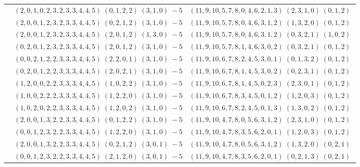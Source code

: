 \documentclass[11pt]{article}
\begin{document}
\begin{longtable}[l]{|c|c|c|}
 \cline{2-3} 
 & $(2 ,0 ,1 ,0 ,2 ,3 ,2 ,3 ,3 ,4 ,4 ,5) \;(0 ,1 ,2 ,2) \;(3 ,1 ,0) \;-5$ & $(11 ,9 ,10 ,5 ,7 ,8 ,0 ,4 ,6 ,2 ,1 ,3) \;(2 ,3 ,1 ,0) \;(0 ,1 ,2) \;$\\ 
 \cline{2-3} 
 & $(2 ,0 ,0 ,1 ,2 ,3 ,2 ,3 ,3 ,4 ,4 ,5) \;(0 ,2 ,1 ,2) \;(3 ,1 ,0) \;-5$ & $(11 ,9 ,10 ,5 ,7 ,8 ,0 ,4 ,6 ,3 ,1 ,2) \;(1 ,3 ,2 ,0) \;(0 ,1 ,2) \;$\\ 
 \cline{2-3} 
 & $(2 ,0 ,0 ,1 ,2 ,3 ,2 ,3 ,3 ,4 ,4 ,5) \;(2 ,0 ,1 ,2) \;(1 ,3 ,0) \;-5$ & $(11 ,9 ,10 ,5 ,7 ,8 ,0 ,4 ,6 ,3 ,1 ,2) \;(0 ,3 ,2 ,1) \;(1 ,0 ,2) \;$\\ 
 \cline{2-3} 
 & $(0 ,2 ,0 ,1 ,2 ,3 ,2 ,3 ,3 ,4 ,4 ,5) \;(2 ,0 ,1 ,2) \;(3 ,1 ,0) \;-5$ & $(11 ,9 ,10 ,5 ,7 ,8 ,1 ,4 ,6 ,3 ,0 ,2) \;(0 ,3 ,2 ,1) \;(0 ,1 ,2) \;$\\ 
 \cline{2-3} 
 & $(0 ,0 ,2 ,1 ,2 ,2 ,3 ,3 ,3 ,4 ,4 ,5) \;(2 ,2 ,0 ,1) \;(3 ,1 ,0) \;-5$ & $(11 ,9 ,10 ,6 ,7 ,8 ,2 ,4 ,5 ,3 ,0 ,1) \;(0 ,1 ,3 ,2) \;(0 ,1 ,2) \;$\\ 
 \cline{2-3} 
 & $(0 ,2 ,0 ,1 ,2 ,2 ,3 ,3 ,3 ,4 ,4 ,5) \;(2 ,0 ,2 ,1) \;(3 ,1 ,0) \;-5$ & $(11 ,9 ,10 ,6 ,7 ,8 ,1 ,4 ,5 ,3 ,0 ,2) \;(0 ,2 ,3 ,1) \;(0 ,1 ,2) \;$\\ 
 \cline{2-3} 
 & $(1 ,2 ,0 ,0 ,2 ,2 ,3 ,3 ,3 ,4 ,4 ,5) \;(1 ,0 ,2 ,2) \;(3 ,1 ,0) \;-5$ & $(11 ,9 ,10 ,6 ,7 ,8 ,1 ,4 ,5 ,0 ,2 ,3) \;(2 ,3 ,0 ,1) \;(0 ,1 ,2) \;$\\ 
 \cline{2-3} 
 & $(1 ,0 ,0 ,2 ,2 ,2 ,3 ,3 ,3 ,4 ,4 ,5) \;(1 ,2 ,2 ,0) \;(3 ,1 ,0) \;-5$ & $(11 ,9 ,10 ,6 ,7 ,8 ,3 ,4 ,5 ,0 ,1 ,2) \;(1 ,2 ,0 ,3) \;(0 ,1 ,2) \;$\\ 
 \cline{2-3} 
 & $(1 ,0 ,2 ,0 ,2 ,2 ,3 ,3 ,3 ,4 ,4 ,5) \;(1 ,2 ,0 ,2) \;(3 ,1 ,0) \;-5$ & $(11 ,9 ,10 ,6 ,7 ,8 ,2 ,4 ,5 ,0 ,1 ,3) \;(1 ,3 ,0 ,2) \;(0 ,1 ,2) \;$\\ 
 \cline{2-3} 
 & $(2 ,0 ,0 ,1 ,3 ,2 ,2 ,3 ,3 ,4 ,4 ,5) \;(0 ,1 ,2 ,2) \;(3 ,1 ,0) \;-5$ & $(11 ,9 ,10 ,4 ,7 ,8 ,0 ,5 ,6 ,3 ,1 ,2) \;(2 ,3 ,1 ,0) \;(0 ,1 ,2) \;$\\ 
 \cline{2-3} 
 & $(0 ,0 ,1 ,2 ,3 ,2 ,2 ,3 ,3 ,4 ,4 ,5) \;(1 ,2 ,2 ,0) \;(3 ,1 ,0) \;-5$ & $(11 ,9 ,10 ,4 ,7 ,8 ,3 ,5 ,6 ,2 ,0 ,1) \;(1 ,2 ,0 ,3) \;(0 ,1 ,2) \;$\\ 
 \cline{2-3} 
 & $(2 ,0 ,0 ,1 ,3 ,2 ,2 ,3 ,3 ,4 ,4 ,5) \;(0 ,2 ,1 ,2) \;(3 ,0 ,1) \;-5$ & $(11 ,9 ,10 ,4 ,7 ,8 ,0 ,5 ,6 ,3 ,1 ,2) \;(1 ,3 ,2 ,0) \;(0 ,2 ,1) \;$\\ 
 \cline{2-3} 
 & $(0 ,0 ,1 ,2 ,3 ,2 ,2 ,3 ,3 ,4 ,4 ,5) \;(2 ,1 ,2 ,0) \;(3 ,0 ,1) \;-5$ & $(11 ,9 ,10 ,4 ,7 ,8 ,3 ,5 ,6 ,2 ,0 ,1) \;(0 ,2 ,1 ,3) \;(0 ,2 ,1) \;$\\ 

\end{longtable}
\end{document}
